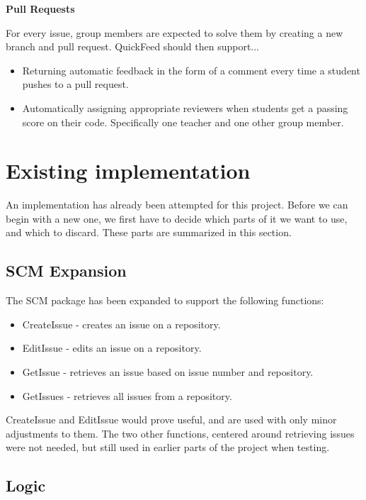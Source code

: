 \textbf{Pull Requests}

For every issue, group members are expected to solve them by creating a new branch and pull request.
QuickFeed should then support...
\begin{itemize}
    \item Returning automatic feedback in the form of a comment every time a student pushes to a pull request.
    \item Automatically assigning appropriate reviewers when students get a passing score on their code.
    Specifically one teacher and one other group member.
\end{itemize}

\section{Existing implementation}

An implementation has already been attempted for this project. %
Before we can begin with a new one, we first have to decide which parts of it we want to use, and which to discard.
These parts are summarized in this section.

\subsection{SCM Expansion}
\label{sec:scm_expansion}

The SCM package has been expanded to support the following functions:

\begin{itemize}
    \item CreateIssue   - creates an issue on a repository.
    \item EditIssue - edits an issue on a repository.
    \item GetIssue  - retrieves an issue based on issue number and repository.
    \item GetIssues - retrieves all issues from a repository.
\end{itemize}

CreateIssue and EditIssue would prove useful, and are used with only minor adjustments to them.
The two other functions, centered around retrieving issues were not needed, but still used in earlier parts of the project when testing.

\subsection{Logic}


